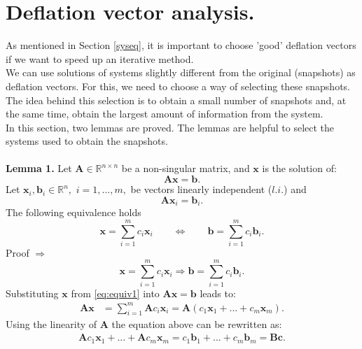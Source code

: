 \documentclass[review]{elsarticle}
\begin{document}
\section{Deflation vector analysis.}\label{as}
As mentioned in Section \ref{syseq}, it is important to choose 'good' deflation vectors if we want to speed up an iterative method.\\ 
We can use solutions of systems slightly different from the original (snapshots) as deflation vectors.
For this, we need to choose a way of selecting these snapshots. The idea behind this selection is to obtain a small number of snapshots and, at the same time,
obtain the largest amount of information from the system.\\
In this section, two lemmas are proved. The lemmas are helpful to select the systems used to obtain the snapshots.\\\\
\textbf{Lemma 1.} 
Let $\mathbf{A} \in \mathbb{R}^{n\times n}$ be a non-singular matrix, and $\mathbf{x}$ is the solution of:
\begin{equation}\label{eq:ls}
\mathbf{A}\mathbf{x}=\mathbf{b}.
\end{equation}
Let $ \mathbf{x}_i, \mathbf{b}_i \in \mathbb{R}^{n},$ $i=1,...,m,$ be
vectors linearly independent ($l.i.$) and 
\begin{equation}\label{eq:lieq}
\mathbf{A}\mathbf{x}_i=\mathbf{b}_i.
\end{equation}
The following equivalence holds
\begin{equation}\label{eq:equiv}
\mathbf{x}=\sum_{i=1}^m {c}_i\mathbf{x}_i \qquad
\Leftrightarrow \qquad
\mathbf{b}=\sum_{i=1}^m {c}_i\mathbf{b}_i.
\end{equation}
Proof $\Rightarrow$
\begin{equation}\label{eq:equiv1}
\mathbf{x}=\sum_{i=1}^m {c}_i\mathbf{x}_i 
\Rightarrow 
\mathbf{b}=\sum_{i=1}^m {c}_i\mathbf{b}_i.
\end{equation}
Substituting $\mathbf{x}$ from \eqref{eq:equiv1} into $\mathbf{A}\mathbf{x}=\mathbf{b}$ leads to:
\begin{align*}
\mathbf{A}\mathbf{x}&=\sum_{i=1}^m \mathbf{A}{c}_i\mathbf{x}_i=\mathbf{A}(c_1\mathbf{x}_1+...+c_m\mathbf{x}_m).
\end{align*}
Using the linearity of $\mathbf{A}$ the equation above can be rewritten as:
\begin{align}\label{eq:bc}
\mathbf{A}c_1\mathbf{x}_1+...+\mathbf{A}c_m\mathbf{x}_m
=c_1\mathbf{b}_1+...+c_m\mathbf{b}_m=\mathbf{B}\mathbf{c}.
\end{align}
\end{document}
